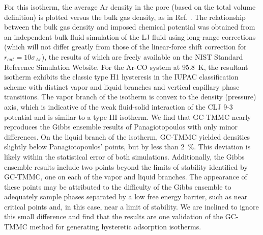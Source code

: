 %
For this isotherm, the average Ar density in the pore (based on the total volume definition) is plotted versus the bulk gas density, as in Ref. . The relationship between the bulk gas density and imposed chemical potential was obtained from an independent bulk fluid simulation of the LJ fluid using long-range corrections (which will not differ greatly from those of the linear-force shift correction for $r_{cut}=10\sigma_{Ar}$), the results of which are freely available on the NIST Standard Reference Simulation Website\cite{NIST_SRSW}. For the Ar-CO system at 95.8~K, the resultant isotherm exhibits the classic type H1 hysteresis in the IUPAC classification scheme\cite{Sing_Reporting_1985} with distinct vapor and liquid branches and vertical capillary phase transitions. The vapor branch of the isotherm is convex to the density (pressure) axis, which is indicative of the weak fluid-solid interaction of the CLJ 9-3 potential\cite{Siderius_Extension_2011a} and is similar to a type III isotherm\cite{Sing_Reporting_1985}. We find that GC-TMMC nearly reproduces the Gibbs ensemble results of Panagiotopoulos with only minor differences. On the liquid branch of the isotherm, GC-TMMC yielded densities slightly below Panagiotopoulos' points, but by less than 2~\%. This deviation is likely within the statistical error of both simulations. Additionally, the Gibbs ensemble results include two points beyond the limits of stability identified by GC-TMMC, one on each of the vapor and liquid branches. The appearance of these points may be attributed to the difficulty of the Gibbs ensemble to adequately sample phases separated by a low free energy barrier, such as near critical points and, in this case, near a limit of stability. We are inclined to ignore this small difference and find that the results are one validation of the GC-TMMC method for generating hysteretic adsorption isotherms.

